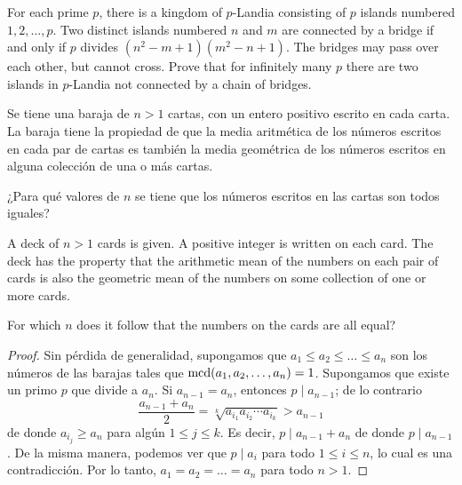 \begin{probMG}[ISL 2020/N2]
	For each prime $p$, there is a kingdom of $p$-Landia consisting of $p$ islands numbered $1,2,\dots,p$. Two distinct islands numbered $n$ and $m$ are connected by a bridge if and only if $p$ divides $(n^2-m+1)(m^2-n+1)$. The bridges may pass over each other, but cannot cross. Prove that for infinitely many $p$ there are two islands in $p$-Landia not connected by a chain of bridges.
\end{probMG}

\begin{probMG}
	Se tiene una baraja de $n>1$ cartas, con un entero positivo escrito en cada carta. La baraja tiene la propiedad de que la media aritmética de los números escritos en cada par de cartas es también la media geométrica de los números escritos en alguna colección de una o más cartas.

	¿Para qué valores de $n$ se tiene que los números escritos en las cartas son todos iguales?
	\begin{hint}
		A deck of $n>1$ cards is given. A positive integer is written on each card. The deck has the property that the arithmetic mean of the numbers on each pair of cards is also the geometric mean of the numbers on some collection of one or more cards.

		For which $n$ does it follow that the numbers on the cards are all equal?
	\end{hint}
\end{probMG}

\begin{proof}
	Sin pérdida de generalidad, supongamos que $a_1\le a_2\le\dots\le a_n$ son los números de las barajas tales que $\operatorname{mcd}(a_1,a_2,\dots,a_n)=1$. Supongamos que existe un primo $p$ que divide a $a_n$. Si $a_{n-1}=a_n$, entonces $p\mid a_{n-1}$; de lo contrario
	\[\frac{a_{n-1}+a_n}{2}=\sqrt[k]{a_{i_1}a_{i_2}\cdots a_{i_k}}>a_{n-1}\]
	de donde $a_{i_j}\ge a_n$ para algún $1\le j\le k$. Es decir, $p\mid a_{n-1}+a_n$ de donde $p\mid a_{n-1}$. De la misma manera, podemos ver que $p\mid a_i$ para todo $1\le i\le n$, lo cual es una contradicción. Por lo tanto, $a_1=a_2=\dots=a_n$ para todo $n>1$.
\end{proof}

